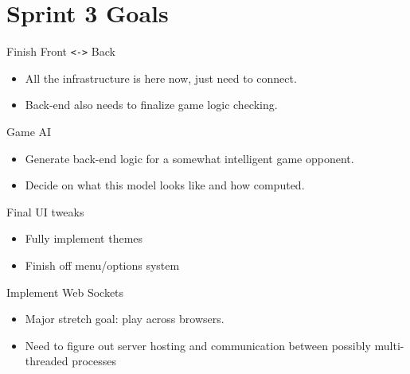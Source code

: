 \documentclass[allowframebreaks]{beamer}
\begin{document}
\section{Sprint 3 Goals}
\label{sec:orgf2072c6}
\begin{frame}[fragile,label={sec:org168b2e6}]{Finish Front \texttt{<->} Back}
 \begin{itemize}
\item All the infrastructure is here now, just need to connect.
\item Back-end also needs to finalize game logic checking.
\end{itemize}
\end{frame}
\begin{frame}[label={sec:org8f99bf5}]{Game AI}
\begin{itemize}
\item Generate back-end logic for a somewhat intelligent game opponent.
\item Decide on what this model looks like and how computed.
\end{itemize}
\end{frame}
\begin{frame}[label={sec:org75fe911}]{Final UI tweaks}
\begin{itemize}
\item Fully implement themes
\item Finish off menu/options system
\end{itemize}
\end{frame}
\begin{frame}[label={sec:org1d0eb19}]{Implement Web Sockets}
\begin{itemize}
\item Major stretch goal: play across browsers.
\item Need to figure out server hosting and communication between possibly multi-threaded processes
\end{itemize}
\end{frame}
\end{document}
